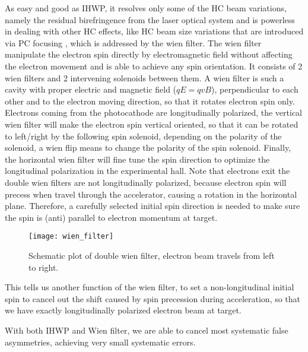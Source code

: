 As easy and good as IHWP, it resolves only some of the HC beam variations, namely
the residual birefringence from the laser optical system and is powerless in dealing
with other HC effects, like HC beam size variations that are introduced via
PC focusing \cite{osti_1059486}, which is addressed by the wien filter.
The wien filter manipulate the electron spin directly by electromagnetic field 
without affecting the electron movement and is able to achieve any spin orientation.
It consists of 2 wien filters and 2 intervening solenoids between them.
A wien filter is such a cavity with proper electric and magnetic field ($qE = qvB$), 
perpendicular to each other and to the electron moving direction, so that it 
rotates electron spin only.
Electrons coming from the photocathode are longitudinally polarized,
the vertical wien filter will make the electron spin vertical oriented, so that
it can be rotated to left/right by the following spin solenoid, depending on
the polarity of the solenoid, a wien flip means to change the polarity of the spin solenoid.
Finally, the horizontal wien filter will fine tune the spin direction to optimize 
the longitudinal polarization in the experimental hall. Note that electrons
exit the double wien filters are not longitudinally polarized, because electron
spin will precess when travel through the accelerator, causing a rotation in the
horizontal plane. Therefore, a carefully selected initial spin direction is 
needed to make sure the spin is (anti) parallel to electron momentum at target.
\begin{figure}
    \centering
    \texttt{[image: wien\_filter]}
    \caption{Schematic plot of double wien filter, electron beam travels from left
    to right. \cite{osti_1059486}}
    \label{fig:double_wien_filter}
\end{figure}

This tells us another function of the wien filter, to set a non-longitudinal 
initial spin to cancel out the shift caused by spin precession during acceleration, 
so that we have exactly longitudinally polarized electron beam at target.

With both IHWP and Wien filter, we are able to cancel most systematic false 
asymmetries, achieving very small systematic errors.
\begin{comment}
    IHWP
    \begin{itemize}
	\item Cancels electronic cross talk and Pockels Cell steering
	\item  Residual linear polarization effects do not cancel
	\item Spot size asymmetry, which we cannot measure, does not cancel
    \end{itemize}

    Wine filters and solenoid
    \begin{itemize}
	\item Cancels all helicity-correlated beam asymmetries from Injector including spot size
    \end{itemize}
\end{comment}

